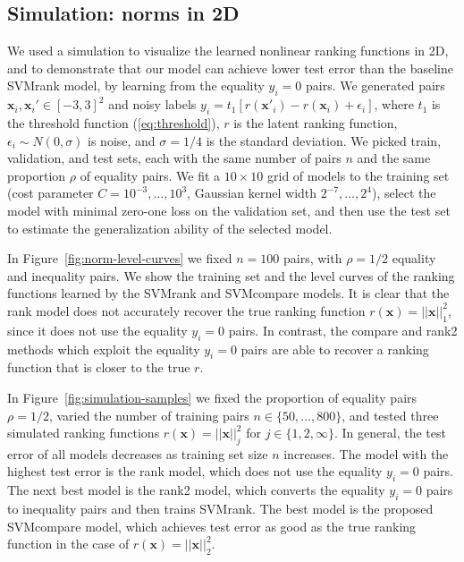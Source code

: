 \documentclass{article}
\begin{document}
\subsection{Simulation: norms in 2D}
\label{sec:simulations}

We used a simulation to visualize the learned nonlinear ranking
functions in 2D, and to demonstrate that our model can achieve lower
test error than the baseline SVMrank model, by learning from the
equality $y_i=0$ pairs.  We generated pairs $\mathbf x_i,\mathbf
x_i'\in[-3,3]^2$ and noisy labels $y_i=t_1[r(\mathbf x'_i)-r(\mathbf
x_i)+\epsilon_i]$, where $t_1$ is the threshold function
(\ref{eq:threshold}), $r$ is the latent ranking function,
$\epsilon_i\sim N(0, \sigma)$ is noise, and $\sigma=1/4$ is the
standard deviation. We picked train, validation, and test sets, each
with the same number of pairs $n$ and the same proportion $\rho$ of
equality pairs. We fit a $10\times 10$ grid of models to the training
set (cost parameter $C=10^{-3},\dots,10^3$, Gaussian kernel width
$2^{-7},\dots,2^4$), select the model with minimal zero-one loss on
the validation set, and then use the test set to estimate the
generalization ability of the selected model.

In Figure~\ref{fig:norm-level-curves} we fixed $n=100$ pairs, with
$\rho=1/2$ equality and inequality pairs. We show the training set and
the level curves of the ranking functions learned by the SVMrank and
SVMcompare models. It is clear that the rank model does not accurately
recover the true ranking function $r(\mathbf x)=||\mathbf x||_1^2$,
since it does not use the equality $y_i=0$ pairs. In contrast, the
compare and rank2 methods which exploit the equality $y_i=0$ pairs are
able to recover a ranking function that is closer to the true $r$.

In Figure~\ref{fig:simulation-samples} we fixed the proportion of
equality pairs $\rho=1/2$, varied the number of training pairs
$n\in\{50,\dots, 800\}$, and tested three simulated ranking functions
$r(\mathbf x)=||\mathbf x||^2_j$ for $j\in\{1,2,\infty\}$. In general,
the test error of all models decreases as training set size $n$
increases. The model with the highest test error is the rank model,
which does not use the equality $y_i=0$ pairs. The next best model is
the rank2 model, which converts the equality $y_i=0$ pairs to
inequality pairs and then trains SVMrank. The best model is the
proposed SVMcompare model, which achieves test error as good as the
true ranking function in the case of $r(\mathbf x)=||\mathbf x||^2_2$.
\end{document}
